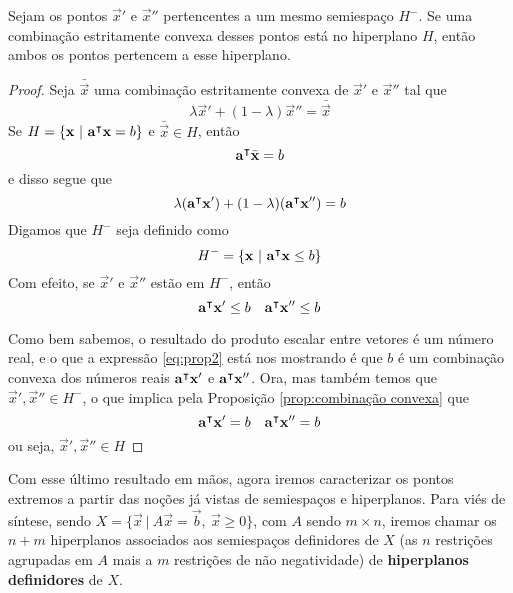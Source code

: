 \begin{prop:hiperplano e ponto extremo}
	\label{prop:hiperplano e ponto extremo}
	Sejam os pontos $\vec{x}'$ e $\vec{x}''$ pertencentes a um mesmo semiespaço $H^-$. Se uma combinação estritamente convexa desses pontos está no hiperplano $H$, então ambos os pontos pertencem a esse hiperplano.
	
	\begin{proof}
		Seja $\bar{\vec{x}}$ uma combinação estritamente convexa de $\vec{x}'$ e $\vec{x}''$ tal que 
		\[\lambda \vec{x}' + (1 - \lambda) \vec{x}'' = 		\bar{\vec{x}}\]
		Se $H = \{\mathbf{x}\ |\ \mathbf{a}^\intercal\mathbf{x} = b\}$ e $\bar{\vec{x}} \in H$, então
		\[\mathbf{a}^\intercal\bar{\mathbf{x}} = b\]
		e disso segue que
		\begin{equation}
			\label{eq:prop2}
			\lambda (\mathbf{a}^\intercal\mathbf{x}') + (1 - \lambda) 	(\mathbf{a}^\intercal\mathbf{x}'') = b
		\end{equation}
		Digamos que $H^-$ seja definido como
		\[H^- = \{\vec{x}\ |\ \transp{a}\vec{x} \leq b\}\]
		Com efeito, se $\vec{x}'$ e $\vec{x}''$ estão em $H^-$, então
		\[\mathbf{a}^\intercal\mathbf{x}' \leq b \quad \mathbf{a}^\intercal\mathbf{x}'' \leq b\]
	
		
		Como bem sabemos, o resultado do produto escalar entre vetores é um número real, e o que a expressão \ref{eq:prop2} está nos mostrando é que $b$ é um combinação convexa dos números reais $\mathbf{a}^\intercal\mathbf{x}'$ e $\mathbf{a}^\intercal\mathbf{x}''$. Ora, mas também temos que $\vec{x}', \vec{x}'' \in H^-$, o que implica pela Proposição \ref*{prop:combinação convexa} que
		\[\mathbf{a}^\intercal\mathbf{x}' = b \quad \mathbf{a}^\intercal\mathbf{x}'' = b\]ou seja, $\vec{x}', \vec{x}'' \in H$
	\end{proof} 
\end{prop:hiperplano e ponto extremo}

Com esse último resultado em mãos, agora iremos caracterizar os pontos extremos a partir das noções já vistas de semiespaços e hiperplanos. Para viés de síntese, sendo $X = \{\vec{x}\ |\ A\vec{x} = \vec{b},\ \vec{x} \geq 0\}$, com $A$ sendo $m \times n$, iremos chamar os $n + m$ hiperplanos associados aos semiespaços definidores de $X$ (as $n$ restrições agrupadas em $A$ mais a $m$ restrições de não negatividade) de \textbf{hiperplanos definidores} de $X$.  

